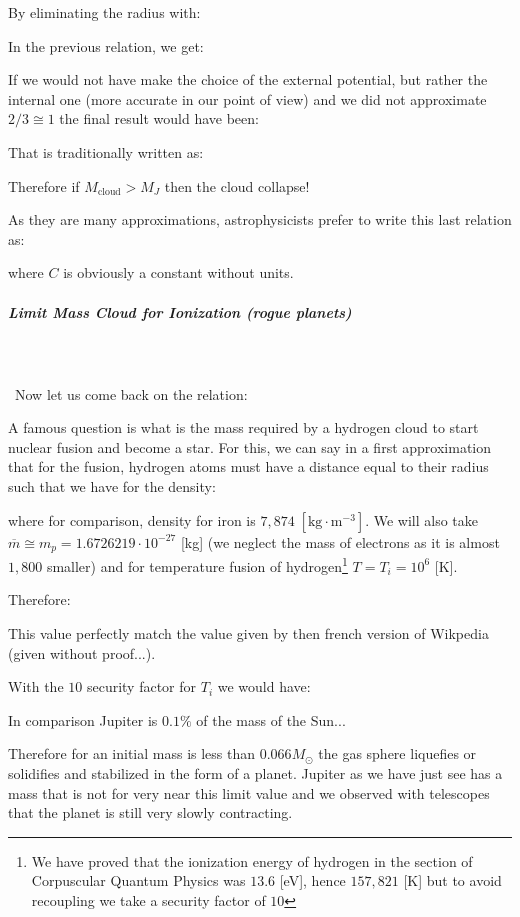 	By eliminating the radius with:
	
	In the previous relation, we get:
	
	If we would not have make the choice of the external potential, but rather the internal one (more accurate in our point of view) and we did not approximate $2/3\cong 1$ the final result would have been:
	
	That is traditionally written as:
	
	Therefore if $M_\text{cloud}>M_J$ then the cloud collapse!
	
	As they are many approximations, astrophysicists prefer to write this last relation as:
	
	where $C$ is obviously a constant without units.
	
	\pagebreak
	\subparagraph{Limit Mass Cloud for Ionization (rogue planets)}\mbox{}\\\\\
	Now let us come back on the relation:
	
	A famous question is what is the mass required by a hydrogen cloud to start nuclear fusion and become a star. For this, we can say in a first approximation that for the fusion, hydrogen atoms must have a distance equal to their radius such that we have for the density:
	
	where for comparison, density for iron is $7,874\;[\text{kg}\cdot \text{m}^{-3}]$. We will also take $\overline{m}\cong m_p = 1.6726219\cdot 10^{-27}$ [kg] (we neglect the mass of electrons as it is almost $1,800$ smaller) and for temperature fusion of hydrogen\footnote{We have proved that the ionization energy of hydrogen in the section of Corpuscular Quantum Physics was $13.6$ [eV], hence $157,821$ [K] but to avoid recoupling we take a security factor of $10$} $T=T_i=10^6$ [K].
	
	Therefore:
	
	This value perfectly match the value given by then french version of Wikpedia (given without proof...).
	
	With the $10$ security factor for $T_i$ we would have:
	
	In comparison Jupiter is $0.1\%$ of the mass of the Sun...
	
	Therefore for an initial mass is less than $0.066 M_\odot $ the gas sphere liquefies or solidifies and stabilized in the form of a planet. Jupiter as we have just see has a mass that is not for very near this limit value and we observed with telescopes that the planet is still very slowly contracting. 
	
